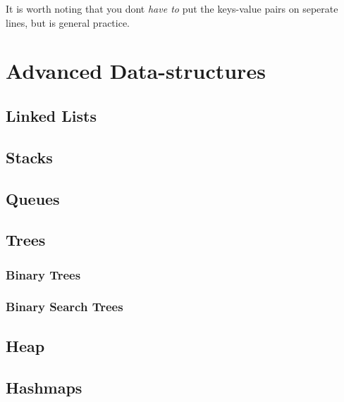 \documentclass[12pt,a4paper]{book}
\begin{document}
			It is worth noting that you dont \textit{have to} put the keys-value pairs on seperate lines, but is general practice.
			
		\section{Advanced Data-structures}
			\subsection{Linked Lists}
				\vspace{15cm}
			\subsection{Stacks}
				\vspace{15cm}

			\subsection{Queues}
				\vspace{15cm}

			\subsection{Trees}
				\subsubsection{Binary Trees}
					\vspace{15cm}

				\subsubsection{Binary Search Trees}
					\vspace{15cm}

				\subsection{Heap}
					\vspace{15cm}

			\subsection{Hashmaps}
				\vspace{15cm}
\end{document}
